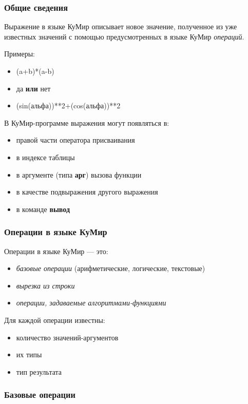 \documentclass[12pt,a4paper]{article}
\begin{document}
\subsubsection{Общие сведения}

	Выражение в языке КуМир описывает новое значение, полученное из уже известных значений с помощью предусмотренных в языке КуМир \emph{операций}.

	Примеры:
\begin{itemize}
\item \textsf{(a+b)*(a-b)}
\item \textsf{да \textbf{или} нет}
\item \textsf{(sin(альфа))**2+(cos(альфа))**2}
\end{itemize}
	
	В КуМир-программе выражения могут появляться в:
\begin{itemize}
\item правой части оператора присваивания
\item в индексе таблицы
\item в аргументе (типа \textbf{арг}) вызова функции
\item в качестве подвыражения другого выражения
\item в команде \textbf{вывод}
\end{itemize}

\subsubsection{Операции в языке КуМир}

	Операции в языке КуМир --- это:
\begin{itemize}
\item \emph{базовые операции} (арифметические, логические, текстовые)
\item \emph{вырезка из строки}
\item \emph{операции, задаваемые алгоритмами-функциями}
\end{itemize}

	Для каждой операции известны:
\begin{itemize}
\item количество значений-аргументов
\item их типы
\item тип результата
\end{itemize}
	
\subsubsection{Базовые операции}
\end{document}
